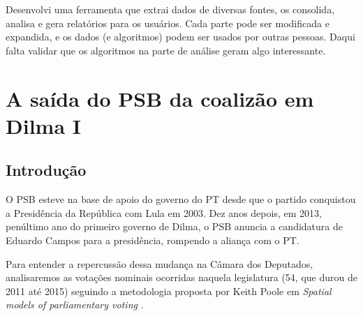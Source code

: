 \documentclass[a4paper,titlepage]{ppgi}\usepackage[]{graphicx}\usepackage[]{color}
\begin{document}
Desenvolvi uma ferramenta que extrai dados de diversas fontes, os consolida, analisa e gera relatórios para os usuários. Cada parte pode ser modificada e expandida, e os dados (e algoritmos) podem ser usados por outras pessoas. Daqui falta validar que os algoritmos na parte de análise geram algo interessante.







\appendix




\chapter{A saída do PSB da coalizão em Dilma I}\label{cap:analise-saida-psb}

\section{Introdução}

O PSB esteve na base de apoio do governo do PT desde que o partido conquistou a
Presidência da República com Lula em 2003. Dez anos depois, em 2013, penúltimo
ano do primeiro governo de Dilma, o PSB anuncia a candidatura de Eduardo Campos
para a presidência, rompendo a aliança com o PT.

Para entender a repercussão dessa mudança na Câmara dos Deputados, analisaremos
as votações nominais ocorridas naquela legislatura (54\textordfeminine, que
durou de 2011 até 2015) seguindo a metodologia proposta por Keith Poole em
\emph{Spatial models of parliamentary voting} \cite{Poole2005}.
\end{document}
